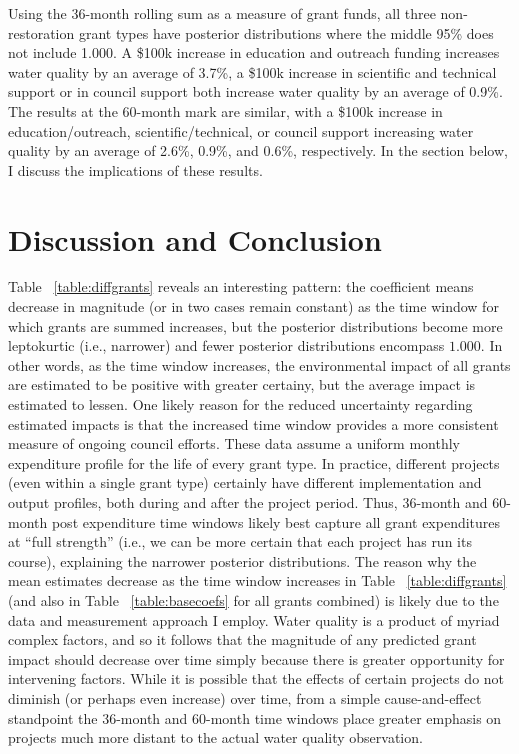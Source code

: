 \documentclass[11pt,a4paper,titlepage]{article}
\begin{document}
Using the 36-month rolling sum as a measure of grant funds, all three non-restoration grant types have posterior distributions where the middle 95\% does not include 1.000. A \$100k increase in education and outreach funding increases water quality by an average of 3.7\%, a \$100k increase in scientific and technical support or in council support both increase water quality by an average of 0.9\%. The results at the 60-month mark are similar, with a \$100k increase in education/outreach, scientific/technical, or council support increasing water quality by an average of 2.6\%, 0.9\%, and 0.6\%, respectively. In the section below, I discuss the implications of these results. 

\section*{Discussion and Conclusion}

Table ~\ref{table:diffgrants} reveals an interesting pattern: the coefficient means decrease in magnitude (or in two cases remain constant) as the time window for which grants are summed increases, but the posterior distributions become more leptokurtic (i.e., narrower) and fewer posterior distributions encompass $1.000$. In other words, as the time window increases, the environmental impact of all grants are estimated to be positive with greater certainy, but the average impact is estimated to lessen. One likely reason for the reduced uncertainty regarding estimated impacts is that the increased time window provides a more consistent measure of ongoing council efforts. These data assume a uniform monthly expenditure profile for the life of every grant type. In practice, different projects (even within a single grant type) certainly have different implementation and output profiles, both during and after the project period. Thus, 36-month and 60-month post expenditure time windows likely best capture all grant expenditures at ``full strength'' (i.e., we can be more certain that each project has run its course), explaining the narrower posterior distributions. The reason why the mean estimates decrease as the time window increases in Table ~\ref{table:diffgrants} (and also in Table ~\ref{table:basecoefs} for all grants combined) is likely due to the data and measurement approach I employ. Water quality is a product of myriad complex factors, and so it follows that the magnitude of any predicted grant impact should decrease over time simply because there is greater opportunity for intervening factors. While it is possible that the effects of certain projects do not diminish (or perhaps even increase) over time, from a simple cause-and-effect standpoint the 36-month and 60-month time windows place greater emphasis on projects much more distant to the actual water quality observation.
\end{document}
